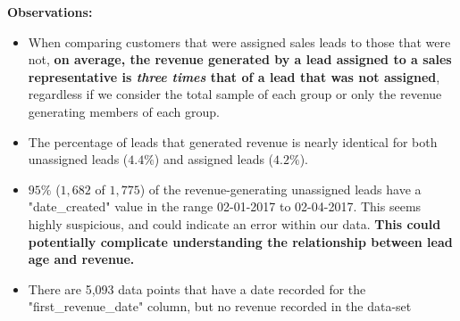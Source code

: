 \documentclass[11pt]{article}
\begin{document}
\textbf{Observations:}
\begin{itemize}
    \item When comparing customers that were assigned sales leads to those that were not, \textbf{on average, the revenue generated by a lead assigned to a sales representative is \textit{three times} that of a lead that was not assigned}, regardless if we consider the total sample of each group or only the revenue generating members of each group. 
    \item The percentage of leads that generated revenue is nearly identical for both unassigned leads ($4.4\%$) and assigned leads ($4.2\%$).
    \item $95\%$ ($1,682$ of $1,775$) of the revenue-generating unassigned leads have a "date\_created" value in the range 02-01-2017 to 02-04-2017. This seems highly suspicious, and could indicate an error within our data. \textbf{This could potentially complicate understanding the relationship between lead age and revenue.} 
    \item There are 5,093 data points that have a date recorded for the "first\_revenue\_date" column, but no revenue recorded in the data-set
\end{itemize}
\end{document}
